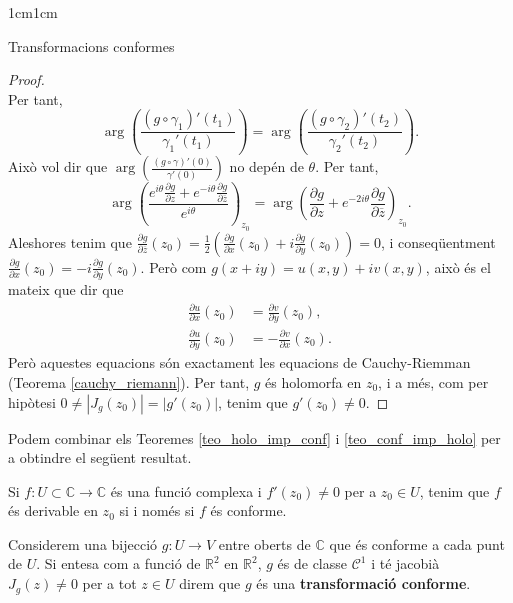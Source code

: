 \begin{adjustwidth}{1cm}{1cm}
\begin{subsection}{Transformacions conformes}
\begin{proof}
\[        \]
        Per tant, 
        \[
            \operatorname{arg}\left(\frac{(g\circ\gamma_1)'(t_1)}{\gamma_1'(t_1)}\right)=\operatorname{arg}\left(\frac{(g\circ\gamma_2)'(t_2)}{\gamma_2'(t_2)}\right).
        \]
        Això vol dir que $\operatorname{arg}\left(\frac{(g\circ\gamma)'(0)}{\gamma'(0)}\right)$ no depén de $\theta$. Per tant, 
        \[
            \operatorname{arg}\left(\frac{e^{i\theta}\frac{\partial g}{\partial z}+e^{-i\theta}\frac{\partial g}{\partial \overline{z}}}{e^{i\theta}}\right)_{z_0}=\operatorname{arg}\left(\frac{\partial g}{\partial z}+e^{-2i\theta}\frac{\partial g}{\partial \overline{z}}\right)_{z_0}.
        \]
        Aleshores tenim que $\frac{\partial g}{\partial \overline{z}}(z_0)=\frac{1}{2}(\frac{\partial g}{\partial x}(z_0)+i \frac{\partial g}{\partial y}(z_0))=0$, i conseqüentment $\frac{\partial g}{\partial x}(z_0)=-i \frac{\partial g}{\partial y}(z_0)$. Però com $g(x + iy) = u(x, y)+iv(x, y)$, això és el mateix que dir que
        \begin{equation*}
            \begin{aligned}
                \frac{\partial u}{\partial x}(z_0) &= \frac{\partial v}{\partial y}(z_0), \\
                \frac{\partial u}{\partial y}(z_0) &= -\frac{\partial v}{\partial x}(z_0).
            \end{aligned}
        \end{equation*}
        Però aquestes equacions són exactament les equacions de Cauchy-Riemman (Teorema \ref{cauchy_riemann}). Per tant, $g$ és holomorfa en $z_0$, i a més, com per hipòtesi $0\neq |J_g(z_0)|=|g'(z_0)|$, tenim que $g'(z_0)\neq 0$.

    \end{proof}

    Podem combinar els Teoremes \ref{teo_holo_imp_conf} i \ref{teo_conf_imp_holo} per a obtindre el següent resultat.

    \begin{corolari}
        Si $f:U\subset\mathbb{C}\to \mathbb{C}$ és una funció complexa i $f'(z_0)\neq 0$ per a $z_0\in U$, tenim que $f$ és derivable en $z_0$ si i només si $f$ és conforme.
        \label{nota_conf_sii_holomorfa}
    \end{corolari}

    \begin{definicio}
        Considerem una bijecció $g:U\to V$ entre oberts de $\mathbb{C}$ que és conforme a cada punt de $U$. Si entesa com a funció de $\mathbb{R}^2$ en $\mathbb{R}^2$, $g$ és de classe $\mathcal{C}^1$ i té jacobià $J_g(z)\neq 0$ per a tot $z\in U$ direm que $g$ és una \textbf{transformació conforme}.
    \end{definicio}


\end{subsection}
\end{adjustwidth}
